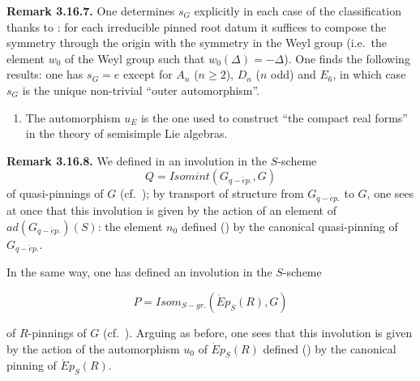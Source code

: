 \textbf{Remark 3.16.7.}  One determines \(s_{G}\) explicitly in each case of the classification thanks to : for each
irreducible pinned root datum it suffices to compose the symmetry through the origin with the symmetry in the Weyl group
(i.e.~the element \(w_{0}\) of the Weyl group such that \(w_{0}(\Delta) = -\Delta\)). One finds the following results: one
has \(s_{G} = e\) except for \(A_{n}\) (\(n \geqslant 2\)), \(D_{n}\) (\(n\) odd) and \(E_6\), in which case \(s_{G}\) is the unique
non-trivial ``outer automorphism''.

\begin{enumerate}
\def\labelenumi{(\roman{enumi})}
\setcounter{enumi}{1}
\item
  The automorphism \(u_{E}\) is the one used to construct ``the compact real forms'' in the theory of semisimple Lie
  algebras.
\end{enumerate}

\textbf{Remark 3.16.8.} We defined in  an involution in the \(S\)-scheme
\[
Q = Isomint(G_{q-\acute{e}p.}, G)
\]
of quasi-pinnings of \(G\) (cf.~); by transport of structure from \(G_{q-\acute{e}p.}\) to \(G\), one sees at once that
this involution is given by the action of an element of \(ad(G_{q-\acute{e}p.})(S)\): the element \(n_{0}\) defined () by the canonical quasi-pinning of \(G_{q-\acute{e}p.}\).

In the same way, one has defined an involution in the \(S\)-scheme

\[ P = Isom_{S-gr.}(\acute{E}p_{S}(R), G) \]

of \(R\)-pinnings of \(G\) (cf.~). Arguing as before, one sees that this involution is given by the action of the
automorphism \(u_{0}\) of \(\acute{E}p_{S}(R)\) defined () by the canonical pinning of \(\acute{E}p_{S}(R)\).



